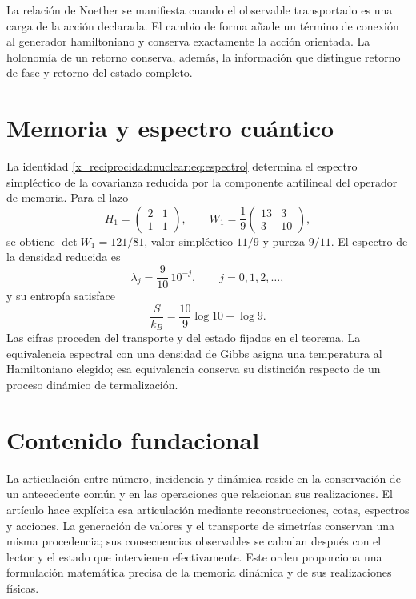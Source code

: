 La relación de Noether se manifiesta cuando el observable transportado es una carga de la acción declarada. El cambio de forma añade un término de conexión al generador hamiltoniano y conserva exactamente la acción orientada. La holonomía de un retorno conserva, además, la información que distingue retorno de fase y retorno del estado completo.

\section{Memoria y espectro cuántico}
La identidad \eqref{x_reciprocidad:nuclear:eq:espectro} determina el espectro simpléctico de la covarianza reducida por la componente antilineal del operador de memoria. Para el lazo
\[
H_1=\begin{pmatrix}2&1\\1&1\end{pmatrix},
\qquad
W_1=\frac19\begin{pmatrix}13&3\\3&10\end{pmatrix},
\]
se obtiene \(\det W_1=121/81\), valor simpléctico \(11/9\) y pureza \(9/11\). El espectro de la densidad reducida es
\[
\lambda_j=\frac9{10}\,10^{-j},\qquad j=0,1,2,\ldots,
\]
y su entropía satisface
\[
\frac{S}{k_B}=\frac{10}{9}\log10-\log9.
\]
Las cifras proceden del transporte y del estado fijados en el teorema. La equivalencia espectral con una densidad de Gibbs asigna una temperatura al Hamiltoniano elegido; esa equivalencia conserva su distinción respecto de un proceso dinámico de termalización.

\section{Contenido fundacional}
La articulación entre número, incidencia y dinámica reside en la conservación de un antecedente común y en las operaciones que relacionan sus realizaciones. El artículo hace explícita esa articulación mediante reconstrucciones, cotas, espectros y acciones. La generación de valores y el transporte de simetrías conservan una misma procedencia; sus consecuencias observables se calculan después con el lector y el estado que intervienen efectivamente. Este orden proporciona una formulación matemática precisa de la memoria dinámica y de sus realizaciones físicas.
